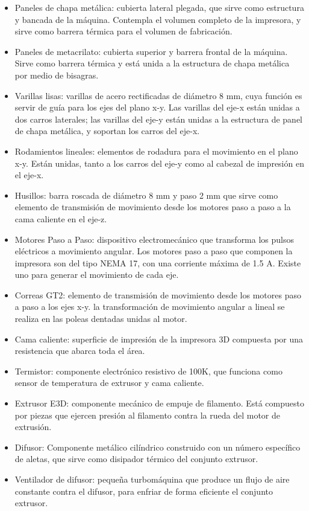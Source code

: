 \begin{itemize}
\item Paneles de chapa metálica: cubierta lateral plegada, que sirve como estructura y bancada de la máquina. Contempla el volumen completo de la impresora, y sirve como barrera térmica para el volumen de fabricación. 
\item Paneles de metacrilato: cubierta superior y barrera frontal de la máquina. Sirve como barrera térmica y está unida a la estructura de chapa metálica por medio de bisagras.
\item Varillas lisas: varillas de acero rectificadas de diámetro 8 mm, cuya función es servir de guía para los ejes del plano x-y. Las varillas del eje-x están unidas a dos carros laterales; las varillas del eje-y están unidas a la estructura de panel de chapa metálica, y soportan los carros del eje-x.
\item Rodamientos lineales: elementos de rodadura para el movimiento en el plano x-y. Están unidas, tanto a los carros del eje-y como al cabezal de impresión en el eje-x.
\item Husillos: barra roscada de diámetro 8 mm y paso 2 mm que sirve como elemento de transmisión de movimiento desde los motores paso a paso a la cama caliente en el eje-z. 
\item Motores Paso a Paso: dispositivo electromecánico que transforma los pulsos eléctricos a movimiento angular. Los motores paso a paso que componen la impresora son del tipo NEMA 17, con una corriente máxima de 1.5 A. Existe uno para generar el movimiento de cada eje.
\item Correas GT2: elemento de transmisión de movimiento desde los motores paso a paso a los ejes x-y. la transformación de movimiento angular a lineal se realiza en las poleas dentadas unidas al motor.
\item Cama caliente: superficie de impresión de la impresora 3D compuesta por una resistencia que abarca toda el área. 
\item Termistor: componente electrónico resistivo de 100K, que funciona como sensor de temperatura de extrusor y cama caliente.
\item Extrusor E3D: componente mecánico de empuje de filamento. Está compuesto por piezas que ejercen presión al filamento contra la rueda del motor de extrusión.
\item Difusor: Componente metálico cilíndrico construido con un número específico de aletas, que sirve como disipador térmico del conjunto extrusor.
\item Ventilador de difusor: pequeña turbomáquina que produce un flujo de aire constante contra el difusor, para enfriar de forma eficiente el conjunto extrusor.

\end{itemize}
